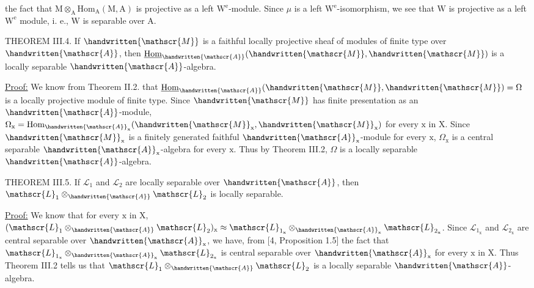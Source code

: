 the fact that $\mathrm M\otimes_{\mathrm A}\mathrm{Hom}_{\mathrm A}(\mathrm M,\mathrm A)$ is projective as a left $\mathrm W^{\mathrm e}$-module. Since $\mu$ is a left $\mathrm W^{\mathrm e}$-isomorphism, we see that $\mathrm W$ is projective as a left $\mathrm W^{\mathrm e}$ module, i. e., $\mathrm W$ is separable over $\mathrm A$.

THEOREM III.4. If $\handwritten{\mathscr{M}}$ is a faithful locally projective sheaf of modules of finite type over $\handwritten{\mathscr{A}}$, then $\underline{\mathrm{Hom}}_{\handwritten{\mathscr{A}}}(\handwritten{\mathscr{M}},\handwritten{\mathscr{M}})$ is a locally separable $\handwritten{\mathscr{A}}$-algebra.

\uline{Proof:} We know from Theorem II.2. that $\underline{\mathrm{Hom}}_{\handwritten{\mathscr{A}}}(\handwritten{\mathscr{M}},\handwritten{\mathscr{M}})=\Omega$ is a locally projective module of finite type. Since $\handwritten{\mathscr{M}}$ has finite presentation as an $\handwritten{\mathscr{A}}$-module, $\Omega_{\mathrm x}=\mathrm{Hom}_{\handwritten{\mathscr{A}}_{\mathrm x}}(\handwritten{\mathscr{M}}_{\mathrm x},\handwritten{\mathscr{M}}_{\mathrm x})$ for every $\mathrm x$ in $\mathrm X$. Since $\handwritten{\mathscr{M}}_{\mathrm x}$ is a finitely generated faithful $\handwritten{\mathscr{A}}_{\mathrm x}$-module for every $\mathrm x$, $\Omega_{\mathrm x}$ is a central separable $\handwritten{\mathscr{A}}_{\mathrm x}$-algebra for every $\mathrm x$. Thus by Theorem III.2, $\Omega$ is a locally separable $\handwritten{\mathscr{A}}$-algebra.

THEOREM III.5. If $\mathscr{L}_1$ and $\mathscr{L}_2$ are locally separable over $\handwritten{\mathscr{A}}$, then $\mathscr{L}_1\otimes_{\handwritten{\mathscr{A}}}\mathscr{L}_2$ is locally separable.

\uline{Proof:} We know that for every $\mathrm x$ in $\mathrm X$, $(\mathscr{L}_1\otimes_{\handwritten{\mathscr{A}}}\mathscr{L}_2)_{\mathrm x}\approx \mathscr{L}_{1_{\mathrm x}}\otimes_{\handwritten{\mathscr{A}}_{\mathrm x}}\mathscr{L}_{2_{\mathrm x}}$. Since $\mathscr{L}_{1_{\mathrm x}}$ and $\mathscr{L}_{2_{\mathrm x}}$ are central separable over $\handwritten{\mathscr{A}}_{\mathrm x}$, we have, from [4, Proposition 1.5] the fact that $\mathscr{L}_{1_{\mathrm x}}\otimes_{\handwritten{\mathscr{A}}_{\mathrm x}}\mathscr{L}_{2_{\mathrm x}}$ is central separable over $\handwritten{\mathscr{A}}_{\mathrm x}$ for every $\mathrm x$ in $\mathrm X$. Thus Theorem III.2 tells us that $\mathscr{L}_1\otimes_{\handwritten{\mathscr{A}}}\mathscr{L}_2$ is a locally separable $\handwritten{\mathscr{A}}$-algebra.
